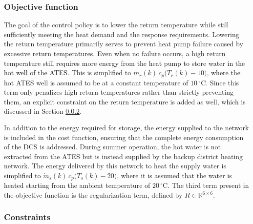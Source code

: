 \subsubsection{Objective function}
The goal of the control policy is to lower the return temperature while still sufficiently meeting the heat demand and the response requirements. Lowering the return temperature primarily serves to prevent heat pump failure caused by excessive return temperatures. Even when no failure occurs, a high return temperature still requires more energy from the heat pump to store water in the hot well of the ATES. This is simplified to $\dot{m}_r(k)\, c_p \big(T_r(k) - 10\big)$, where the hot ATES well is assumed to be at a constant temperature of $10\,^{\circ}$C. Since this term only penalizes high return temperatures rather than strictly preventing them, an explicit constraint on the return temperature is added as well, which is discussed in Section \ref{sec::optconstraints}.

In addition to the energy required for storage, the energy supplied to the network is included in the cost function, ensuring that the complete energy consumption of the DCS is addressed. During summer operation, the hot water is not extracted from the ATES but is instead supplied by the backup district heating network. The energy delivered by this network to heat the supply water is simplified to $\dot{m}_s(k)\, c_p \big(T_s(k) - 20\big)$, where it is assumed that the water is heated starting from the ambient temperature of $20\,^{\circ}$C. The third term present in the objective function is the regularization term, defined by $R \in \mathbb{R}^{6 \times 6}$.

\subsubsection{Constraints}\label{sec::optconstraints}


